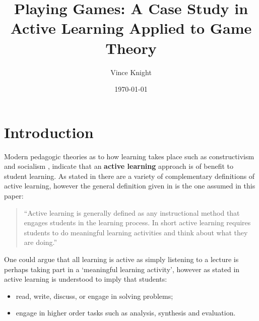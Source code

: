 \documentclass[12pt, a4paper]{article}
\title{Playing Games: A Case Study in Active Learning Applied to Game Theory}
\author{Vince Knight}
\date{\today}
\begin{document}
\maketitle


\section{Introduction}\label{sec:introduction}

Modern pedagogic theories as to how learning takes place such as constructivism
and socialism \cite{Illeris2009, Jordan2008a}, indicate that an \textbf{active
learning} approach is of benefit to student learning.  As stated in
\cite{Prince2004} there are a variety of complementary definitions of active
learning, however the general definition given in \cite{Prince2004} is the one
assumed in this paper:

\begin{quote}
``Active learning is generally defined as any instructional method that engages
students in the learning process. In short active learning requires students to
do meaningful learning activities and think about what they are doing.''
\end{quote}

One could argue that all learning is active as simply listening to a lecture is
perhaps taking part in a `meaningful learning activity', however as stated in
\cite{Bonwell1991} active learning is understood to imply that students:

\begin{itemize}
    \item read, write, discuss, or engage in solving problems;
    \item engage in higher order tasks such as analysis, synthesis and
        evaluation.
\end{itemize}
\end{document}
